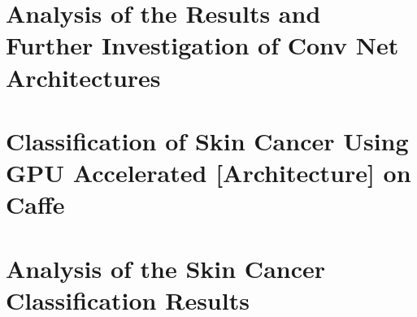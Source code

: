 \documentclass[paper=a4, fontsize=11pt]{scrartcl}
\numberwithin{equation}{section}		%
\numberwithin{figure}{section}			%
\numberwithin{table}{section}			%
\begin{document}
	
	
	
	\section{Analysis of the Results and Further Investigation of Conv Net Architectures}
	\section{Classification of Skin Cancer Using GPU Accelerated [Architecture] on Caffe}
	\section{Analysis of the Skin Cancer Classification Results}
	
	



\end{document}
